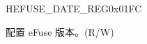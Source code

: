 \begin{register}{H}{EFUSE\_DATE\_REG}{0x01FC}\label{regdesc:EFUSEDATEREG}
%
%
\regnewline%
\begin{regdesc}\begin{reglist}
\label{fielddesc:EFUSEDATE}\item [EFUSE\_DATE] 配置 eFuse 版本。(R/W)
\end{reglist}\end{regdesc}
\end{register}
